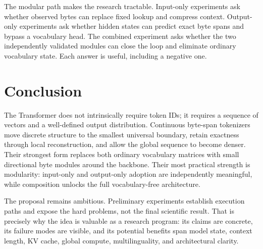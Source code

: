 \documentclass[10pt,twocolumn]{article}
\begin{document}
The modular path makes the research tractable. Input-only experiments ask whether observed bytes
can replace fixed lookup and compress context. Output-only experiments ask whether hidden states
can predict exact byte spans and bypass a vocabulary head. The combined experiment asks whether
the two independently validated modules can close the loop and eliminate ordinary vocabulary state.
Each answer is useful, including a negative one.

\section{Conclusion}

The Transformer does not intrinsically require token IDs; it requires a sequence of vectors and a
well-defined output distribution. Continuous byte-span tokenizers move discrete structure to the
smallest universal boundary, retain exactness through local reconstruction, and allow the global
sequence to become denser. Their strongest form replaces both ordinary vocabulary matrices with
small directional byte modules around the backbone. Their most practical strength is modularity:
input-only and output-only adoption are independently meaningful, while composition unlocks the
full vocabulary-free architecture.

The proposal remains ambitious. Preliminary experiments establish execution paths and expose the
hard problems, not the final scientific result. That is precisely why the idea is valuable as a
research program: its claims are concrete, its failure modes are visible, and its potential benefits span
model state, context length, KV cache, global compute, multilinguality, and architectural clarity.

{\small


}
\end{document}
